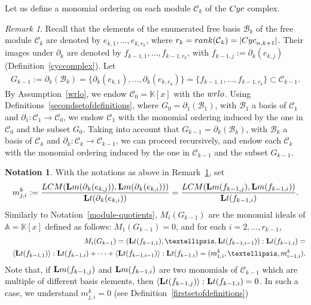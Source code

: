 \documentclass[10pt]{amsart}
\newcommand{\mbk}{\mbox{$\mathbb{K}$}}
\newcommand{\mba}{\mbox{$\mathbb{A}$}}
\newcommand{\lm}{\mbox{${\bf L}{\rm m}$}}
\newcommand{\lt}{\mbox{${\bf L}{\rm t}$}}
\newcommand{\mcb}{\mbox{$\mathcal{B}$}}
\newcommand{\mcc}{\mbox{$\mathcal{C}$}}
\newcommand{\dif}{\mbox{$\partial$}}
\newcommand{\Lcm}{\mbox{${\rm LCM}$}}
\newcommand{\rank}{\mbox{${\rm rank}$}}
\newcommand{\cyc}{\mbox{${\rm Cyc}$}}
\newcommand{\wrlo}{\mbox{${\rm wrlo}$}}
\theoremstyle{definition}
\newtheorem{notation}[cdrthm]{Notation}
\theoremstyle{remark}
\newtheorem{remark}[cdrthm]{Remark}
\begin{document}
Let us define a monomial ordering on each module $\mcc_{k}$ of the
$\cyc$ complex.

\begin{remark}\label{mon-ordering}
Recall that the elements of the enumerated free basis $\mcb_k$ of the
free module $\mcc_k$ are denoted by $e_{k,1},\ldots ,e_{k,r_k}$, where
$r_k=\rank(\mcc_k)=\lvert\cyc_{n,k+1}\rvert$. Their images under
$\dif_k$ are denoted by $f_{k-1,1},\ldots ,f_{k-1,r_k}$, with
$f_{k-1,j}:=\dif_k(e_{k,j})$ (Definition~\ref{cyccomplex}). Let
\begin{eqnarray*}
G_{k-1}:=\dif_k(\mcb_k)= \{\dif_{k}(e_{k,1}),\ldots
,\dif_{k}(e_{k,r_k})\}= \{f_{k-1,1},\ldots
,f_{k-1,r_k}\}\subset\mcc_{k-1}.
\end{eqnarray*}
By Assumption~\ref{wrlo}, we endow $\mcc_0=\mbk[x]$ with the
$\wrlo$. Using Definitions~\ref{secondsetofdefinitions}, where
$G_0=\dif_1(\mcb_1)$, with $\mcb_1$ a basis of $\mcc_1$ and
$\dif_1:\mcc_1\to\mcc_0$, we endow $\mcc_1$ with the monomial ordering
induced by the one in $\mcc_0$ and the subset $G_0$. Taking into
account that $G_{k-1}=\dif_k(\mcb_{k})$, with $\mcb_{k}$ a basis of
$\mcc_k$ and $\dif_k:\mcc_k\to\mcc_{k-1}$, we can proceed recursively,
and endow each $\mcc_k$ with the monomial ordering induced by the one
in $\mcc_{k-1}$ and the subset $G_{k-1}$.
\end{remark}

\begin{notation}\label{m-basis-elements}
With the notations as above in Remark~\ref{mon-ordering}, set
\begin{eqnarray*}
m^k_{j,i}:=\frac{\Lcm(\lm(\dif_{k}(e_{k,j})),\lm(\dif_k(e_{k,i})))}
{\lt(\dif_k(e_{k,i}))}=
\frac{\Lcm(\lm(f_{k-1,j}),\lm(f_{k-1,i}))}{\lt(f_{k-1,i})}.
\end{eqnarray*}
Similarly to Notation~\ref{module-quotients}, $M_i(G_{k-1})$ are the
monomial ideals of $\mba=\mbk[x]$ defined as follows:
$M_1(G_{k-1})=0$, and for each $i=2,\ldots,r_{k-1}$,
\begin{eqnarray*}
&& M_i(G_{k-1})=(\lt(f_{k-1,1}),\ldots,\lt(f_{k-1,i-1})):\lt(f_{k-1,i})=
  \\ && \langle\lt(f_{k-1,1})\rangle:\lt(f_{k-1,i})+\cdots+
  \langle\lt(f_{k-1,i-1})\rangle:\lt(f_{k-1,i})= (m^k_{1,i},\ldots
  ,m^k_{i-1,i}).
\end{eqnarray*}
Note that, if $\lm(f_{k-1,j})$ and $\lm(f_{k-1,i})$ are two monomials
of $\mcc_{k-1}$ which are multiple of different basis elements, then
$\langle\lt(f_{k-1,j})\rangle:\lt(f_{k-1,i})=0$. In such a case, we
understand $m_{j,i}^k=0$ (see Definition~\ref{firstsetofdefinitions})
\end{notation}
 
\end{document}
